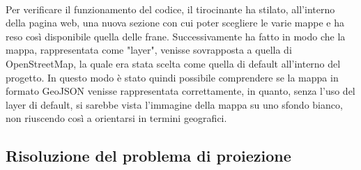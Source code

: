 \\Per verificare il funzionamento del codice, il tirocinante ha stilato, all'interno della pagina web, una nuova sezione con cui poter scegliere le varie mappe e ha reso così disponibile quella delle frane. Successivamente ha fatto in modo che la mappa, rappresentata come "layer", venisse sovrapposta a quella di OpenStreetMap, la quale era stata scelta come quella di default all'interno del progetto. In questo modo è stato quindi possibile comprendere se la mappa in formato GeoJSON venisse rappresentata correttamente, in quanto, senza l'uso del layer di default, si sarebbe vista l'immagine della mappa su uno sfondo bianco, non riuscendo così a orientarsi in termini geografici.

\subsection{Risoluzione del problema di proiezione}

